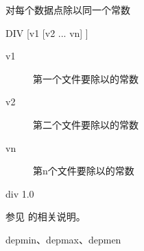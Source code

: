 \label{cmd:div}

对每个数据点除以同一个常数

\begin{SACSTX}
DIV [v1 [v2 ... vn] ]
\end{SACSTX}

\begin{description}
\item [v1] 第一个文件要除以的常数
\item [v2] 第二个文件要除以的常数
\item [vn] 第n个文件要除以的常数
\end{description}

\begin{SACDFT}
div 1.0
\end{SACDFT}

参见  的相关说明。

depmin、depmax、depmen
